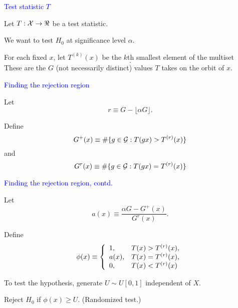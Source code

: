 \documentclass[landscape]{slides}
\newcommand{\cG}{{\cal G}}
\newcommand{\cX}{{\cal X}}
\newcommand{\beq}{\begin{equation}}
\newcommand{\eeq}{\end{equation}}
\begin{document}
\begin{slide}
{\textcolor{blue}{Test statistic $T$}}

Let $T: \cX \rightarrow \Re$ be a test statistic.

We want to test $H_0$ at significance level $\alpha$.

For each fixed $x$, let $T^{(k)}(x)$ be the $k$th smallest 
element of the multiset
\beq
    [ T(gx): g \in \cG ].
\eeq
These are the $G$ (not necessarily distinct) values $T$ takes on the orbit of $x$.

\end{slide}

\begin{slide}
{\textcolor{blue}{Finding the rejection region}}

Let
\beq
     r \equiv G - \lfloor \alpha G \rfloor.
\eeq

Define
\beq
     G^+(x) \equiv \# \{ g \in \cG: T(gx) > T^{(r)}(x) \}
\eeq
and
\beq
     G^r(x) \equiv \# \{ g \in \cG: T(gx) = T^{(r)}(x) \}
\eeq

\end{slide}

\begin{slide}
{\textcolor{blue}{Finding the rejection region, contd.}}

Let
\beq
      a(x) \equiv \frac{\alpha G - G^+(x)}{G^r(x)}.
\eeq

Define
\beq
   \phi(x) \equiv 
        \left \{ 
            \begin{array}{ll}
                 1,      &  T(x) > T^{(r)}(x), \cr
                a(x),   &  T(x) = T^{(r)}(x), \cr
                 0,      &  T(x) < T^{(r)}(x)
            \end{array}
         \right .
\eeq

To test the hypothesis, generate $U \sim U[0, 1]$ independent of $X$.

Reject $H_0$ if $\phi(x) \ge U$.  (Randomized test.)

\end{slide}
\end{document}

